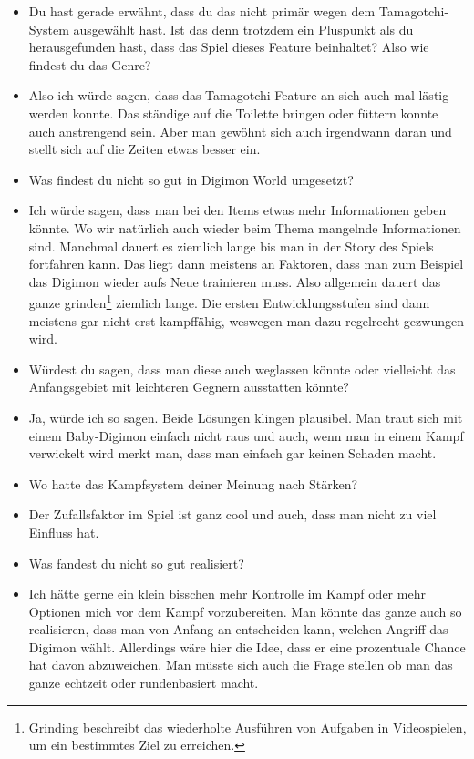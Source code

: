 {\begin{itemize}[]
    \item {} Du hast gerade erwähnt, dass du das nicht primär wegen dem Tamagotchi-System ausgewählt hast. Ist das denn trotzdem ein Pluspunkt als du herausgefunden hast, dass das Spiel dieses Feature beinhaltet? Also wie findest du das Genre?
    \item {} Also ich würde sagen, dass das Tamagotchi-Feature an sich auch mal lästig werden konnte. Das ständige auf die Toilette bringen oder füttern konnte auch anstrengend sein. Aber man gewöhnt sich auch irgendwann daran und stellt sich auf die Zeiten etwas besser ein.
    \item {} Was findest du nicht so gut in Digimon World umgesetzt?
    \item {} Ich würde sagen, dass man bei den Items etwas mehr Informationen geben könnte. Wo wir natürlich auch wieder beim Thema mangelnde Informationen sind. Manchmal dauert es ziemlich lange bis man in der Story des Spiels fortfahren kann. Das liegt dann meistens an Faktoren, dass man zum Beispiel das Digimon wieder aufs Neue trainieren muss. Also allgemein dauert das ganze grinden\footnote{Grinding beschreibt das wiederholte Ausführen von Aufgaben in Videospielen, um ein bestimmtes Ziel zu erreichen.} ziemlich lange. Die ersten Entwicklungsstufen sind dann meistens gar nicht erst kampffähig, weswegen man dazu regelrecht gezwungen wird.
    \item {} Würdest du sagen, dass man diese auch weglassen könnte oder vielleicht das Anfangsgebiet mit leichteren Gegnern ausstatten könnte?
    \item {} Ja, würde ich so sagen. Beide Lösungen klingen plausibel. Man traut sich mit einem Baby-Digimon einfach nicht raus und auch, wenn man in einem Kampf verwickelt wird merkt man, dass man einfach gar keinen Schaden macht.
    \item {} Wo hatte das Kampfsystem deiner Meinung nach Stärken?
    \item {} Der Zufallsfaktor im Spiel ist ganz cool und auch, dass man nicht zu viel Einfluss hat. 
    \item {} Was fandest du nicht so gut realisiert?
    \item {} Ich hätte gerne ein klein bisschen mehr Kontrolle im Kampf oder mehr Optionen mich vor dem Kampf vorzubereiten. Man könnte das ganze auch so realisieren, dass man von Anfang an entscheiden kann, welchen Angriff das Digimon wählt. Allerdings wäre hier die Idee, dass er eine prozentuale Chance hat davon abzuweichen. Man müsste sich auch die Frage stellen ob man das ganze echtzeit oder rundenbasiert macht. 
\end{itemize}}
\nolinenumbers